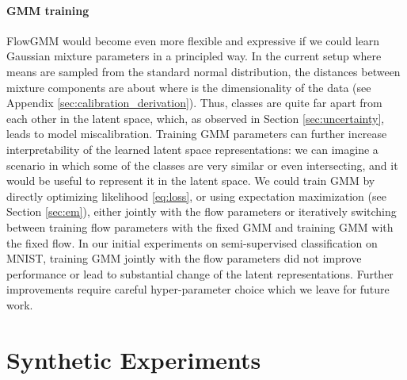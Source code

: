 \documentclass{article}
\begin{document}
\paragraph{GMM training} FlowGMM would become even more flexible and expressive if we could learn Gaussian mixture parameters in a principled way. In the current setup where means are sampled from the standard normal distribution, the distances between mixture components are about  where  is the dimensionality of the data (see Appendix \ref{sec:calibration_derivation}). Thus, classes are quite far apart from each other in the latent space, which, as observed in Section \ref{sec:uncertainty}, leads to model miscalibration. Training GMM parameters can further increase interpretability of the learned latent space representations: we can imagine a scenario in which some of the classes are very similar or even intersecting, and it would be useful to represent it in the latent space. We could train GMM by directly optimizing likelihood \eqref{eq:loss}, or using expectation maximization (see Section \ref{sec:em}), either jointly with the flow parameters or iteratively switching between training flow parameters with the fixed GMM and training GMM with the fixed flow. In our initial experiments on semi-supervised classification on MNIST, training GMM jointly with the flow parameters did not improve performance or lead to substantial change of the latent representations. Further improvements require careful hyper-parameter choice which we leave for future work.

\section{Synthetic Experiments}
\label{sec:synthetic}
\end{document}
